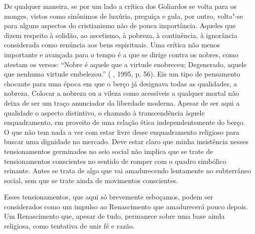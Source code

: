 De qualquer maneira, se por um lado a crítica dos Goliardos se volta
para os monges, vistos como sinônimos de luxúria, preguiça e gula, por
outro, volta"-se para alguns aspectos do cristianismo não de pouca
importância. Aqueles que dizem respeito à solidão, ao ascetismo, à
pobreza, à continência, à ignorância considerada como renúncia aos bens
espirituais. Uma crítica não menos importante e avançada para o tempo é
a que se dirige contra os nobres, como atestam os versos: ``Nobre é
aquele que a virtude enobreceu; Degenerado, aquele que nenhuma virtude
embelezou.'' ( , 1995, p. 56). Eis um tipo de pensamento
chocante para uma época em que o berço já designava todas as qualidades,
a nobreza. Colocar a nobreza ou a vileza como acessíveis a qualquer
mortal não deixa de ser um traço anunciador da liberdade moderna. Apesar
de ser aqui a qualidade o aspecto distintivo, o chamado
à transcendência àquele enquadramento, em proveito de uma relação ética
independentemente do berço. O que não tem nada a ver com estar livre
desse enquadramento religioso para buscar uma dignidade no mercado. Deve
estar claro que minha insistência nesses tensionamentos germinados no seio
social não implica que se trate de tensionamentos conscientes no sentido de romper com o
quadro simbólico reinante. Antes se trata de algo que vai amadurecendo
lentamente no subterrâneo social, sem que se trate ainda de movimentos
conscientes.

Esses tensionamentos, que aqui só brevemente esboçamos, podem ser
considerados como um impulso ao Renascimento que amadurecerá pouco
depois. Um Renascimento que, apesar de tudo, permanece sobre uma base
ainda religiosa, como tentativa de unir fé e razão.

